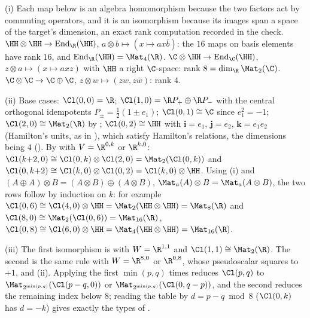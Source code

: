 (i) Each map below is an algebra homomorphism because the two factors act by commuting operators, and it is an isomorphism because its images span a space of the target's dimension, an exact rank computation recorded in the check. $\HH \otimes \HH \to \operatorname{End}_\R(\HH)$, $a \otimes b \mapsto (x \mapsto a x \bar{b})$: the $16$ maps on basis elements have rank $16$, and $\operatorname{End}_\R(\HH) = \Mat_4(\R)$. $\C \otimes \HH \to \operatorname{End}_\C(\HH)$, $z \otimes a \mapsto (x \mapsto a x z)$ with $\HH$ a right $\C$-space: rank $8 = \dim_\R \Mat_2(\C)$. $\C \otimes \C \to \C \oplus \C$, $z \otimes w \mapsto (zw, z\bar{w})$: rank $4$.

(ii) Base cases: $\Cl(0,0) = \R$; $\Cl(1,0) = \R P_+ \oplus \R P_-$ with the central orthogonal idempotents $P_{\pm} = \tfrac12(1 \pm e_1)$; $\Cl(0,1) \cong \C$ since $e_1^{2} = -1$; $\Cl(2,0) \cong \Mat_2(\R)$ by ; $\Cl(0,2) \cong \HH$ with $\mathbf{i} = e_1$, $\mathbf{j} = e_2$, $\mathbf{k} = e_1e_2$ (Hamilton's units, as in ), which satisfy Hamilton's relations, the dimensions being $4$ (). By  with $V = \R^{0,k}$ or $\R^{k,0}$: $\Cl(k{+}2, 0) \cong \Cl(0,k) \otimes \Cl(2,0) = \Mat_2(\Cl(0,k))$ and $\Cl(0, k{+}2) \cong \Cl(k,0) \otimes \Cl(0,2) = \Cl(k,0) \otimes \HH$. Using (i) and $(A \oplus A) \otimes B = (A \otimes B) \oplus (A \otimes B)$, $\Mat_a(A) \otimes B = \Mat_a(A \otimes B)$, the two rows follow by induction on $k$: for example $\Cl(0,6) \cong \Cl(4,0) \otimes \HH = \Mat_2(\HH \otimes \HH) = \Mat_8(\R)$ and $\Cl(8,0) \cong \Mat_2(\Cl(0,6)) = \Mat_{16}(\R)$, $\Cl(0,8) \cong \Cl(6,0) \otimes \HH = \Mat_4(\HH \otimes \HH) = \Mat_{16}(\R)$.

(iii) The first isomorphism is  with $W = \R^{1,1}$ and $\Cl(1,1) \cong \Mat_2(\R)$. The second is the same rule with $W = \R^{8,0}$ or $\R^{0,8}$, whose pseudoscalar squares to $+1$, and (ii). Applying the first $\min(p,q)$ times reduces $\Cl(p,q)$ to $\Mat_{2^{\min(p,q)}}(\Cl(p - q, 0))$ or $\Mat_{2^{\min(p,q)}}(\Cl(0, q - p))$, and the second reduces the remaining index below $8$; reading the table by $d = p - q \bmod 8$ ($\Cl(0,k)$ has $d = -k$) gives exactly the types of .
